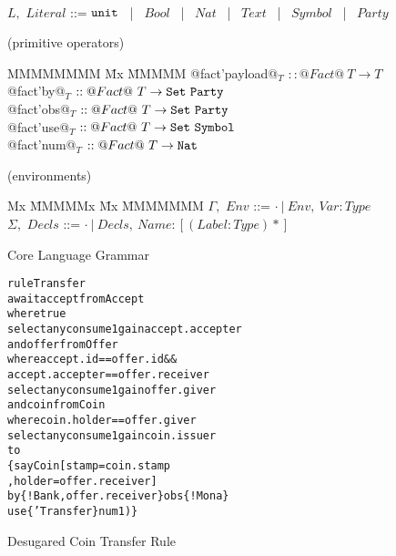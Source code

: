 \begin{figure}
\begin{tabbing}
\\[1ex]
  $L,$   \> $Literal$   \> ::= \> $\texttt{unit}$ ~|~ $Bool$ ~|~ $Nat$ ~|~ $Text$ ~|~ $Symbol$ ~|~ $Party$
\end{tabbing}

\medskip
\begin{flushleft}
(primitive operators)
\end{flushleft}
\begin{tabbing}
MMMMMMMM \= Mx \= MMMMM \kill
   @fact'payload@$_T$ \> $:: @Fact@~ T \to T$
\\ @fact'by@$_T$      \> $:: @Fact@~ T \to \texttt{Set}~ \texttt{Party}$
\\ @fact'obs@$_T$     \> $:: @Fact@~ T \to \texttt{Set}~ \texttt{Party}$
\\ @fact'use@$_T$     \> $:: @Fact@~ T \to \texttt{Set}~ \texttt{Symbol}$
\\ @fact'num@$_T$     \> $:: @Fact@~ T \to \texttt{Nat}$
\end{tabbing}

\medskip
\begin{flushleft}
(environments)
\begin{tabbing}
Mx              \= MMMMMx       \= Mx \= MMMMMMM \kill
   $\Gamma,$       \> $Env$     \> ::= \> $\cdot ~|~ Env,~ Var : Type$
\\ $\Sigma,$       \> $Decls$   \> ::= \> $\cdot ~|~ Decls,~ Name : [(Label : Type)*]$
\end{tabbing}
\end{flushleft}

\caption{Core Language Grammar}
\label{f:Grammar}
\end{figure}


\begin{figure}
\begin{small}
\begin{alltt}
rule  Transfer
await accept from Accept
       where true
       select any  consume 1 gain accept.accepter
 and  offer  from Offer
       where accept.id       == offer.id  &&
             accept.accepter == offer.receiver
       select any  consume 1 gain offer.giver
 and  coin   from Coin
       where coin.holder == offer.giver
       select any  consume 1 gain coin.issuer
to
    \{ say Coin [ stamp  = coin.stamp
               , holder = offer.receiver]
       by  \{ !Bank, offer.receiver \}  obs \{ !Mona \}
       use \{ 'Transfer \}              num 1) \}
\end{alltt}
\end{small}

\caption{Desugared Coin Transfer Rule}
\label{f:CoinTransferDesugared}
\end{figure}


